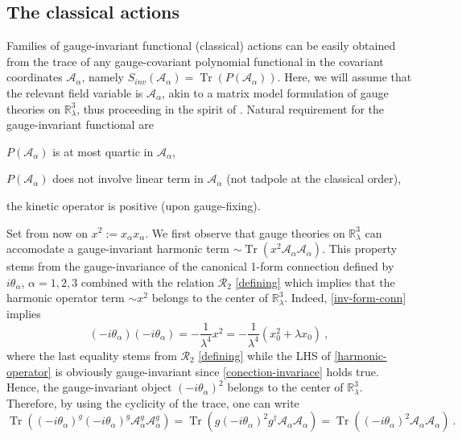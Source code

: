 \documentclass[a4paper,11pt,twoside]{article}
\makeatletter
\numberwithin{equation}{section}
\DeclareMathOperator{\tr}{Tr}
\newcommand{\labitem}[2]{\def\@itemlabel{\textbf{#1}}\item\def\@currentlabel{#1}\label{#2}}
\theoremstyle{nonumberplain}
\newcounter{and}
\makeatother
\begin{document}
\subsection{The classical actions}

Families of gauge-invariant functional (classical) actions can be easily obtained from the trace of any gauge-covariant polynomial functional in the covariant coordinates $\mathcal{A}_\alpha$, namely $S_{inv}(\mathcal{A}_\alpha)=\tr\left(P(\mathcal{A}_\alpha)\right)$. Here, we will assume that the relevant field variable is $\mathcal{A}_\alpha$, akin to a matrix model formulation of gauge theories on $\mathbb{R}^3_\lambda$, thus proceeding in the spirit of \cite{MVW13}. Natural requirement for the gauge-invariant functional are%
%
\begin{description}
\labitem{(i)}{(i)} $P(\mathcal{A}_\alpha)$ is at most quartic in $\mathcal{A}_\alpha$,
\labitem{(ii)}{(ii)} $P(\mathcal{A}_\alpha)$ does not involve linear term in $\mathcal{A}_\alpha$ (not tadpole at the classical order),
\labitem{(iii)}{(iii)} the kinetic operator is positive (upon gauge-fixing).
\end{description}
%
Set from now on $x^2 := x_\alpha x_\alpha$. We first observe that gauge theories on $\mathbb{R}^3_\lambda$ can accomodate a gauge-invariant harmonic term $\sim\tr(x^2\mathcal{A}_\alpha \mathcal{A}_\alpha)$. This property stems from the gauge-invariance of the canonical 1-form connection defined by $i\theta_\alpha$, $\alpha=1,2,3$ combined with the relation $\mathcal{R}_2$ \eqref{defining} which implies that the harmonic operator term $\sim x^2$ belongs to the center of $\mathbb{R}^3_\lambda$. Indeed, \eqref{inv-form-conn} implies%
%
\begin{equation}
(-i\theta_\alpha)(-i\theta_\alpha) = -\frac{1}{\lambda^4}x^2 = -\frac{1}{\lambda^4}(x_0^2+\lambda x_0) \ , \label{harmonic-operator}
\end{equation}
%
where the last equality stems from $\mathcal{R}_2$ \eqref{defining} while the LHS of \eqref{harmonic-operator} is obviously gauge-invariant since \eqref{conection-invariace} holds true. Hence, the gauge-invariant object $(-i\theta_\alpha)^2$ belongs to the center of $\mathbb{R}^3_\lambda$. Therefore, by using the cyclicity of the trace, one can write%
%
\begin{equation}
\tr\left( (-i\theta_\alpha)^g (-i\theta_\alpha)^g \mathcal{A}^g_\alpha \mathcal{A}^g_\alpha \right) = 
\tr\left( g (-i\theta_\alpha)^2 g^\dag \mathcal{A}_\alpha \mathcal{A}_\alpha \right) = 
\tr\left( (-i\theta_\alpha)^2 \mathcal{A}_\alpha \mathcal{A}_\alpha \right) \ . 
\label{harm-inv-dem}
\end{equation}
\end{document}
